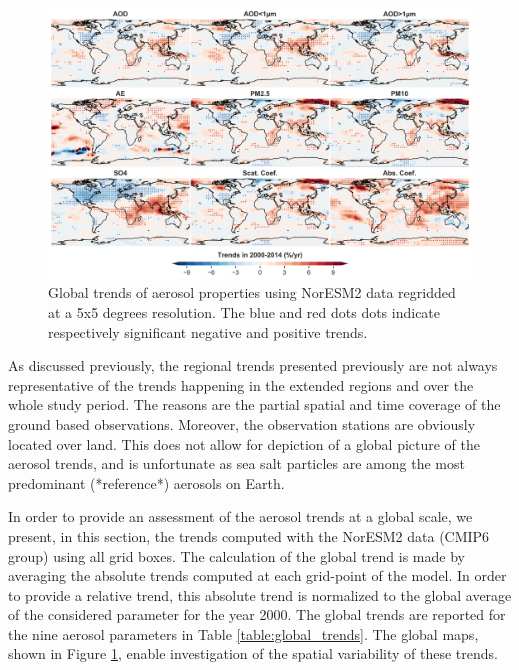 \documentclass[journal abbreviation, manuscript]{copernicus}
\begin{document}
\begin{figure}[t]
 \includegraphics[width=16cm]{../scripts/figs/trends_map2.png}
 \caption{Global trends of aerosol properties using NorESM2 data regridded at a 5x5 degrees resolution. The blue and red dots dots indicate respectively significant negative and positive trends.}
 \label{fig:global_trends}
\end{figure}

As discussed previously, the regional trends presented previously are not always representative of the trends happening in the extended regions and over the whole study period. The reasons are the partial spatial and time coverage of the ground based observations. Moreover, the observation stations are obviously located over land. This does not allow for depiction of a global picture of the aerosol trends, and is unfortunate as sea salt particles are among the most predominant (*reference*) aerosols on Earth.

In order to provide an assessment of the aerosol trends at a global scale, we present, in this section, the trends computed with the NorESM2 data (CMIP6 group) using all grid boxes. The calculation of the global trend is made by averaging the absolute trends computed at each grid-point of the model. In order to provide a relative trend, this absolute trend is normalized to the global average of the considered parameter for the year 2000. The global trends are reported for the nine aerosol parameters in Table \ref{table:global_trends}. The global maps, shown in Figure \ref{fig:global_trends}, enable investigation of the spatial variability of these trends.
\end{document}
